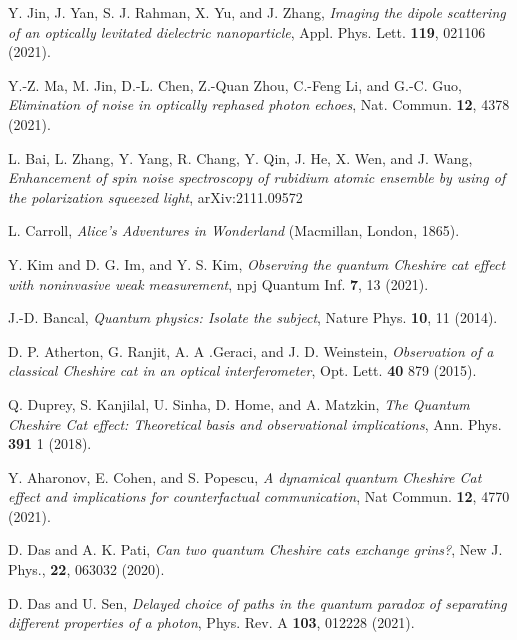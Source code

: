 \documentclass[aps,pra,showpacs,twoside,twocolumn,10pt]{revtex4-1}
\begin{document}
\begin{thebibliography}{100}
 Y. Jin, J. Yan, S. J. Rahman, X. Yu, and J. Zhang, \textit{Imaging the dipole scattering of an optically levitated dielectric nanoparticle}, Appl. Phys. Lett. \textbf{119}, 021106 (2021).

 Y.-Z. Ma, M. Jin, D.-L. Chen, Z.-Quan Zhou, C.-Feng Li, and G.-C. Guo, \textit{Elimination of noise in optically rephased photon echoes}, Nat. Commun. \textbf{12}, 4378 (2021).

 L. Bai, L. Zhang, Y. Yang, R. Chang, Y. Qin, J. He, X. Wen, and J. Wang, \textit{Enhancement of spin noise spectroscopy of rubidium atomic ensemble by using of the polarization squeezed light}, 	arXiv:2111.09572 %

 L. Carroll, \textit{Alice’s Adventures in Wonderland} (Macmillan, London, 1865).

Y. Kim and D. G. Im, and Y. S. Kim, \textit{Observing the quantum Cheshire cat effect with noninvasive weak measurement}, npj Quantum Inf. \textbf{7}, 13 (2021).

 J.-D. Bancal, \textit{Quantum physics: Isolate the subject}, Nature Phys. \textbf{10}, 11 (2014).

 D. P. Atherton, G. Ranjit, A. A .Geraci, and J. D. Weinstein, \textit{Observation of a classical Cheshire cat in an optical interferometer}, Opt. Lett. \textbf{40} 879 (2015).

 Q. Duprey, S. Kanjilal, U. Sinha, D. Home, and A. Matzkin, \textit{The Quantum Cheshire Cat effect: Theoretical basis and observational implications}, Ann. Phys. \textbf{391} 1 (2018).

 Y. Aharonov, E. Cohen, and S. Popescu, \textit{A dynamical quantum Cheshire Cat effect and implications for counterfactual communication}, Nat Commun. \textbf{12}, 4770 (2021).

 D. Das and A. K. Pati, \textit{Can two quantum Cheshire cats exchange grins?}, New J. Phys., \textbf{22}, 063032 (2020).

 D. Das and U. Sen, \textit{Delayed choice of paths in the quantum paradox of separating different properties of a photon}, Phys. Rev. A \textbf{103}, 012228 (2021).


\end{thebibliography}
\end{document}
